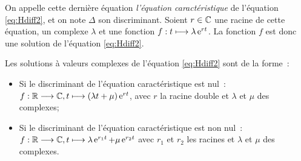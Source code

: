 On appelle cette dernière équation \emph{l'équation caractéristique} de 
l'équation \eqref{eq:Hdiff2}, et on note \(\Delta\) son discriminant. Soient \(r 
\in \mathbb{C}\) une racine de cette équation, un complexe \(\lambda\) et une fonction 
\(f:t \longmapsto \lambda \operatorname{e}^{rt}\). La fonction \(f\) est donc une solution de 
l'équation \eqref{eq:Hdiff2}.

\begin{theo}
    \label{theo:5}
    Les solutions à valeurs complexes de l'équation \eqref{eq:Hdiff2} sont de la forme~:
    \begin{itemize}
        \item Si le discriminant de l'équation caractéristique est nul~: 
            \(f:\mathbb{R} \longrightarrow \mathbb{C}, t \longmapsto (\lambda t + \mu)\operatorname{e}^{rt}\), avec \(r\) 
            la racine double et \(\lambda\) et \(\mu\) des complexes;
        \item Si le discriminant de l'équation caractéristique est non nul~: 
            \(f:\mathbb{R} \longrightarrow \mathbb{C}, t \longmapsto \lambda \operatorname{e}^{r_1 t} + \mu \operatorname{e}^{r_2 t}\) 
            avec \(r_1\) et \(r_2\) les racines et \(\lambda\) et \(\mu\) des 
            complexes.
  \end{itemize}
\end{theo}

